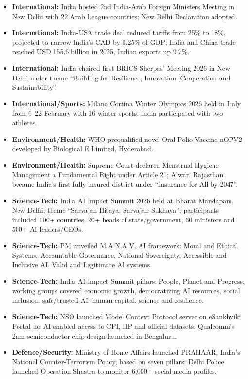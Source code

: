 \documentclass[10pt,a4paper]{article}
\begin{document}
\begin{itemize}
    \item \textbf{International:} India hosted 2nd India-Arab Foreign Ministers Meeting in New Delhi with 22 Arab League countries; New Delhi Declaration adopted.
    \item \textbf{International:} India-USA trade deal reduced tariffs from 25\% to 18\%, projected to narrow India's CAD by 0.25\% of GDP; India and China trade reached USD 155.6 billion in 2025, Indian exports up 9.7\%.
    \item \textbf{International:} India chaired first BRICS Sherpas' Meeting 2026 in New Delhi under theme ``Building for Resilience, Innovation, Cooperation and Sustainability''.
    \item \textbf{International/Sports:} Milano Cortina Winter Olympics 2026 held in Italy from 6--22 February with 16 winter sports; India participated with two athletes.
    \item \textbf{Environment/Health:} WHO prequalified novel Oral Polio Vaccine nOPV2 developed by Biological E Limited, Hyderabad.
    \item \textbf{Environment/Health:} Supreme Court declared Menstrual Hygiene Management a Fundamental Right under Article 21; Alwar, Rajasthan became India's first fully insured district under ``Insurance for All by 2047''.
    \item \textbf{Science-Tech:} India AI Impact Summit 2026 held at Bharat Mandapam, New Delhi; theme ``Sarvajan Hitaya, Sarvajan Sukhaya''; participants included 100+ countries, 20+ heads of state/government, 60 ministers and 500+ AI leaders/CEOs.
    \item \textbf{Science-Tech:} PM unveiled M.A.N.A.V. AI framework: Moral and Ethical Systems, Accountable Governance, National Sovereignty, Accessible and Inclusive AI, Valid and Legitimate AI systems.
    \item \textbf{Science-Tech:} India AI Impact Summit pillars: People, Planet and Progress; working groups covered economic growth, democratizing AI resources, social inclusion, safe/trusted AI, human capital, science and resilience.
    \item \textbf{Science-Tech:} NSO launched Model Context Protocol server on eSankhyiki Portal for AI-enabled access to CPI, IIP and official datasets; Qualcomm's 2nm semiconductor chip design launched in Bengaluru.
    \item \textbf{Defence/Security:} Ministry of Home Affairs launched PRAHAAR, India's National Counter-Terrorism Policy, based on seven pillars; Delhi Police launched Operation Shastra to monitor 6,000+ social-media profiles.

\end{itemize}
\end{document}
